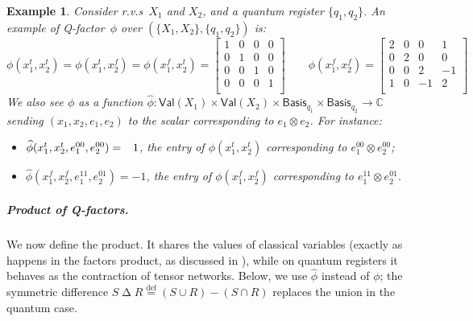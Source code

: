 \documentclass[10pt,a4paper]{article}
\newcommand*{\defeq}{\stackrel{\text{def}}{=}}
\newcommand*{\symdif}{\mathrel{\Delta}}
\newcommand*{\difset}{\mathrel{-}}
\newcommand*{\tens}{\otimes}
\newcommand*{\setofrv}[1]{\mathsf{Val}(#1)}
\newcommand*{\baseof}[1]{\textsf{Basis}_{#1}}
\newcommand*{\C}{\mathbb{C}}
\newcommand{\qfactfunc}[1]{\widehat{#1}}
\newcommand*{\someqfact}{\phi}
\newcommand{\rvs}{r.v.s\xspace}
\newcommand*{\qfactor}{Q-factor}
\newtheorem{example}[theorem]{Example}
\begin{document}
\begin{example}
Consider \rvs\ $X_1$ and $X_2$, and a quantum register $\{q_1,q_2\}$.
An example of \qfactor\ $\someqfact$ over $(\{X_1,X_2\},\{q_1,q_2\})$ is:
\begin{equation*}
\someqfact(x_1^t,x_2^t)
=
\someqfact(x_1^t,x_2^f)
=
\someqfact(x_1^f,x_2^t)
=
\left[\begin{smallmatrix}
	1 & 0 & 0 & 0 \\
	0 & 1 & 0 & 0 \\
	0 & 0 & 1 & 0 \\
	0 & 0 & 0 & 1 \\
\end{smallmatrix}\right]
\qquad
\someqfact(x_1^f,x_2^f)
=
\left[\begin{smallmatrix}
	2 & 0 & 0 & 1 \\
	0 & 2 & 0 & 0 \\
	0 & 0 & 2 & -1 \\
	1 & 0 & -1 & 2 \\
\end{smallmatrix}\right]
\end{equation*}
We also see $\someqfact$ as a function $\qfactfunc{\someqfact}:\setofrv{X_1}\times\setofrv{X_2}\times\baseof{q_1}\times\baseof{q_2} \to \C$ sending $(x_1,x_2,e_1,e_2)$ to the scalar corresponding to $e_1\tens e_2$.
For instance:
\begin{itemize}
\item
$\qfactfunc{\someqfact}(x_1^t,x_2^t,e^{00}_1,e^{00}_2) = \hphantom{-}1$,
the entry of $\someqfact(x_1^t,x_2^t)$ corresponding to $e^{00}_1 \tens e^{00}_2$;
\item
$\qfactfunc{\someqfact}(x_1^f,x_2^f,e^{11}_1,e^{01}_2) = -1$,
the entry of $\someqfact(x_1^f,x_2^f)$ corresponding to $e^{11}_1 \tens e^{01}_2$.
\end{itemize}
\end{example}

\subparagraph*{Product of \qfactor s.}
We now define the product.
It shares the values of classical variables (exactly as happens in the factors product, as discussed in ), while on quantum registers it behaves as the contraction of tensor networks. 
Below, we use $\qfactfunc{\someqfact}$ instead of $\someqfact$; the symmetric difference $S \symdif R \defeq (S \cup R) \difset (S \cap R)$ replaces the union in the quantum case.
\end{document}

